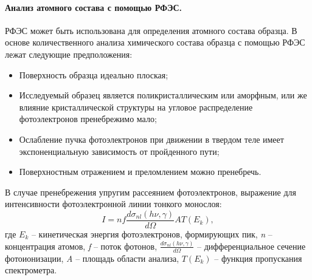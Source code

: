 \paragraph{Анализ атомного состава с помощью РФЭС.} 
РФЭС может быть использована для определения атомного состава образца.
В основе количественного анализа химического состава образца с 
помощью РФЭС лежат следующие предположения:
	\vspace{15pt}
		\begin{itemize}
			\item Поверхность образца идеально плоская;
			\item Исследуемый образец является поликристаллическим или
			аморфным, или же влияние кристаллической структуры на угловое
			распределение фотоэлектронов пренебрежимо мало;
			\item Ослабление пучка фотоэлектронов при движении в твердом теле
			имеет экспоненциальную зависимость от пройденного пути;
			\item Поверхностным отражением и преломлением можно пренебречь.
		\end{itemize}
	\vspace{15pt}
В случае пренебрежения упругим рассеянием фотоэлектронов, выражение
для интенсивности фотоэлектронной линии тонкого монослоя:
	\begin{equation}
		I=nf\frac{d\sigma_{nl}(h\nu,\gamma)}{d\Omega}AT(E_k),
	\end{equation}
где $E_k$ -- кинетическая энергия фотоэлектронов, формирующих пик, 
\textit{n} -- концентрация атомов, \textit{f} -- поток фотонов,
$\frac{d\sigma_{nl}(h\nu,\gamma)}{d\Omega}$ -- дифференциальное
сечение фотоионизации, \textit{A} -- площадь области анализа, $T(E_k)$ -- 
функция пропускания спектрометра.




